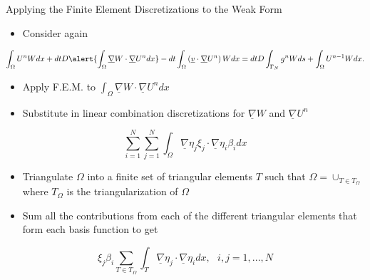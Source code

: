 \documentclass[10pt]{beamer}
\begin{document}
\begin{frame}{Applying the Finite Element Discretizations to the Weak Form} \label{applyingFEMtoweakform}
\begin{itemize}
\item Consider again
\end{itemize}
\footnotesize
\begin{equation}
\int_{\Omega}U^{n}W dx +dtD\alert{\int_{\Omega}\underline{\nabla}W \cdot \underline{\nabla} U^{n} dx}-dt\int_{\Omega}\left(\underline{v}\cdot \underline{\nabla}U^{n}\right)W dx=dtD\int_{\Gamma_{N}}g^{n}W ds+ \int_{\Omega} U^{n-1}W dx.
\end{equation}
\normalsize
\begin{itemize}
\item Apply F.E.M. to $\int_{\Omega}\underline{\nabla}W \cdot \underline{\nabla} U^{n} dx$
\end{itemize}

\begin{itemize}
\item  Substitute in linear combination discretizations for $\underline{\nabla}W$ and $\underline{\nabla}U^{n}$
\end{itemize}

\begin{equation}
\sum_{i=1}^{N}\sum_{j=1}^{N} \int_{\Omega} \underline{\nabla}\eta_{j} \xi_{j} \cdot \underline{\nabla}\eta_{i} \beta_{i} dx
\end{equation}

\begin{itemize}
\item Triangulate $\Omega$ into a finite set of triangular elements $T$ such that $\Omega = \cup_{T \in T_{\Omega}}$ where $T_{\Omega}$ is the triangularization of $\Omega$
\end{itemize}

\begin{itemize}
\item Sum all the contributions from each of the different triangular elements that form each basis function to get
\end{itemize}

\begin{equation}
 \xi_{j}\beta_{i}\sum_{T \in T_{\Omega}}\int_{T} \underline{\nabla} \eta_{j} \cdot \underline{\nabla}\eta_{i} dx, \texttt{ } i,j=1,...,N
\end{equation}

\hyperlink{Questions}{}
\end{frame}
\end{document}

